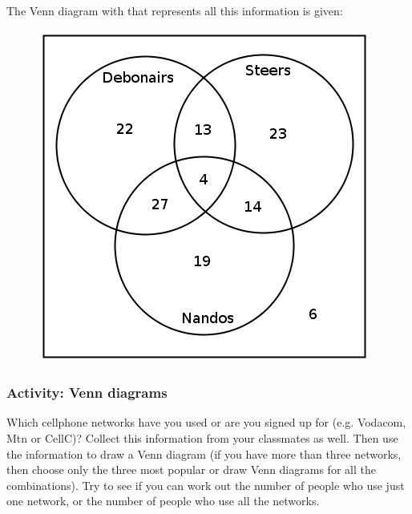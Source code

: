 {\begin{mdframed}[linewidth=4, leftmargin=40, rightmargin=40]
\begin{exercise}
\begin{enumerate}[noitemsep, label=\textbf{Step} \textbf{\arabic*}. ]
The Venn diagram with that represents all this information is given:

    \setcounter{subfigure}{0}


	\begin{figure}[H] %
    \begin{center}
    \label{m39377*id1106!!!underscore!!!media}\label{m39377*id1106!!!underscore!!!printimage}\includegraphics{col11306.imgs/m39377_Vennwex3.png} %
        
      \vspace{2pt}
    \vspace{.1in}
    
    \end{center}

 \end{figure}   

    \addtocounter{footnote}{-0}
    
\end{enumerate}
        


    \end{exercise}
    \end{mdframed}
    }
    \noindent
  
\label{m39377*eip-796}
            \subsubsection{ Activity: Venn diagrams}
            \nopagebreak
            \label{m39377*eip-65}Which cellphone networks have you used or are you signed up for (e.g. Vodacom, Mtn or CellC)? Collect this information from your classmates as well. Then use the information to draw a Venn diagram (if you have more than three networks, then choose only the three most popular or draw Venn diagrams for all the combinations). Try to see if you can work out the number of people who use just one network, or the number of people who use all the networks.
\par \label{m39377*secfhsst!!!underscore!!!id3294}
